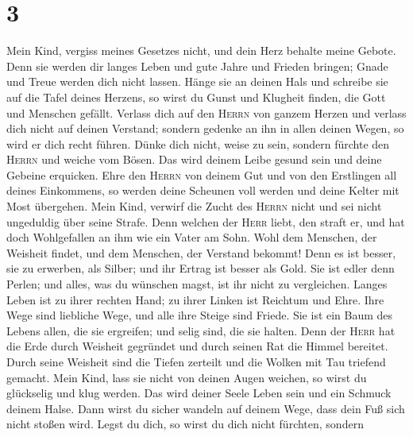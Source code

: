 \hypertarget{section-2}{%
\section{3}\label{section-2}}

 Mein Kind, vergiss meines Gesetzes nicht, und dein Herz
behalte meine Gebote.  Denn sie werden dir langes Leben
und gute Jahre und Frieden bringen;  Gnade und Treue
werden dich nicht lassen. Hänge sie an deinen Hals und schreibe sie auf
die Tafel deines Herzens,  so wirst du Gunst und Klugheit
finden, die Gott und Menschen gefällt.  Verlass dich auf
den \textsc{Herrn} von ganzem Herzen und verlass dich nicht auf deinen
Verstand;  sondern gedenke an ihn in allen deinen Wegen,
so wird er dich recht führen.  Dünke dich nicht, weise zu
sein, sondern fürchte den \textsc{Herrn} und weiche vom Bösen.
 Das wird deinem Leibe gesund sein und deine Gebeine
erquicken.  Ehre den \textsc{Herrn} von deinem Gut und von
den Erstlingen all deines Einkommens,  so werden deine
Scheunen voll werden und deine Kelter mit Most übergehen.
 Mein Kind, verwirf die Zucht des \textsc{Herrn} nicht
und sei nicht ungeduldig über seine Strafe.  Denn welchen
der \textsc{Herr} liebt, den straft er, und hat doch Wohlgefallen an ihm
wie ein Vater am Sohn.  Wohl dem Menschen, der Weisheit
findet, und dem Menschen, der Verstand bekommt!  Denn es
ist besser, sie zu erwerben, als Silber; und ihr Ertrag ist besser als
Gold.  Sie ist edler denn Perlen; und alles, was du
wünschen magst, ist ihr nicht zu vergleichen.  Langes
Leben ist zu ihrer rechten Hand; zu ihrer Linken ist Reichtum und Ehre.
 Ihre Wege sind liebliche Wege, und alle ihre Steige sind
Friede.  Sie ist ein Baum des Lebens allen, die sie
ergreifen; und selig sind, die sie halten.  Denn der
\textsc{Herr} hat die Erde durch Weisheit gegründet und durch seinen Rat
die Himmel bereitet.  Durch seine Weisheit sind die
Tiefen zerteilt und die Wolken mit Tau triefend gemacht. 
Mein Kind, lass sie nicht von deinen Augen weichen, so wirst du
glückselig und klug werden.  Das wird deiner Seele Leben
sein und ein Schmuck deinem Halse.  Dann wirst du sicher
wandeln auf deinem Wege, dass dein Fuß sich nicht stoßen wird.
 Legst du dich, so wirst du dich nicht fürchten, sondern
